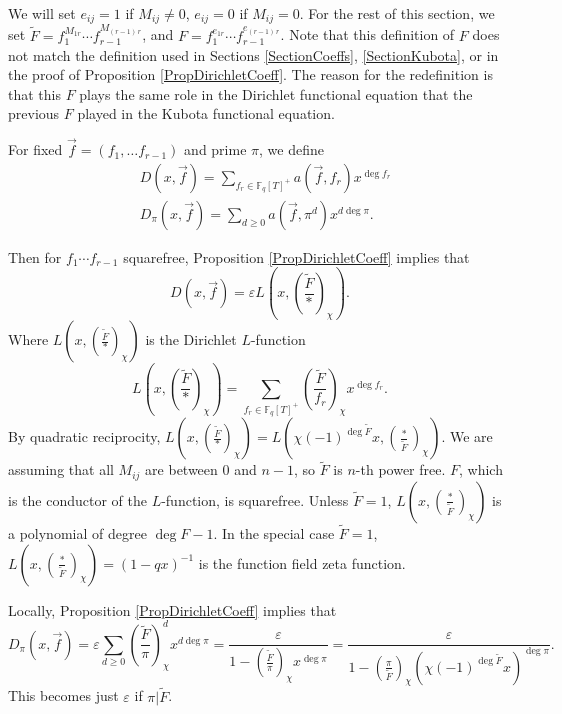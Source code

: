 \documentclass[11pt,letterpaper]{article}
\theoremstyle{definition}
\theoremstyle{remark}
\numberwithin{equation}{section}
\theoremstyle{dotless}
\newcommand{\F}{\mathbb{F}}
\newcommand{\res}[2]{\left(\frac{#1}{#2}\right)}
\renewcommand{\tilde}{\widetilde}
\begin{document}
We will set $e_{ij}=1$ if $M_{ij}\neq 0$, $e_{ij}=0$ if $M_{ij}=0$. For the rest of this section, we set $\tilde{F}=f_1^{M_{1r}}\cdots f_{r-1}^{M_{(r-1) \, r}}$, and $F = f_1^{e_{1r}}\cdots f_{r-1}^{e_{(r-1) \, r}}$. Note that this definition of $F$ does not match the definition used in Sections \ref{SectionCoeffs}, \ref{SectionKubota}, or in the proof of Proposition \ref{PropDirichletCoeff}. The reason for the redefinition is that this $F$ plays the same role in the Dirichlet functional equation that the previous $F$ played in the Kubota functional equation. 

For fixed $\vec{f}=(f_1, \ldots f_{r-1})$ and prime $\pi$, we define 
\begin{align}
&D(x, \vec{f}) = \sum_{f_r \in \F_q[T]^+} a(\vec{f}, f_r) x^{\deg f_r} \\
&D_{\pi}(x, \vec{f}) = \sum_{d \geq 0} a(\vec{f}, \pi^d)x^{d \deg \pi} .
\end{align}

Then for $f_1\cdots f_{r-1}$ squarefree, Proposition \ref{PropDirichletCoeff} implies that 
\begin{equation} \label{DirichletGlobalEval}
D(x, \vec{f}) = \varepsilon L\left(x, \res{\tilde{F}}{*}_{\chi}\right) .
\end{equation} 
Where $L\left(x, \res{\tilde{F}}{*}_{\chi}\right)$ is the Dirichlet $L$-function 
\begin{equation*}
L\left(x, \res{\tilde{F}}{*}_{\chi}\right)=\sum_{f_r \in \F_q[T]^+} \res{\tilde{F}}{f_r}_{\chi} x^{\deg f_r} .
\end{equation*}
By quadratic reciprocity, $L\left(x, \res{\tilde{F}}{*}_{\chi}\right)= L\left(\chi(-1)^{\deg \tilde{F}} x, \res{*}{\tilde{F}}_{\chi}\right)$.
We are assuming that all $M_{ij}$ are between $0$ and $n-1$, so $\tilde{F}$ is $n$-th power free. $F$, which is the conductor of the $L$-function, is squarefree. Unless $\tilde{F}=1$, $L\left(x, \res{*}{\tilde{F}}_{\chi}\right)$ is a polynomial of degree $\deg F-1$. In the special case $\tilde{F}=1$, $L\left(x, \res{*}{\tilde{F}}_{\chi}\right) = (1-qx)^{-1}$ is the function field zeta function.

Locally, Proposition \ref{PropDirichletCoeff} implies that 
\begin{equation} \label{DirichletLocalEval}
D_{\pi}(x, \vec{f}) = \varepsilon \sum_{d \geq 0} \res{\tilde{F}}{\pi}_{\chi}^d x^{d \deg \pi} = \frac{\varepsilon}{1-\res{\tilde{F}}{\pi}_{\chi} x^{\deg \pi}} = \frac{\varepsilon}{1-\res{\pi}{\tilde{F}}_{\chi} (\chi(-1)^{\deg \tilde{F}} x)^{\deg \pi}}.
\end{equation} 
This becomes just $\varepsilon$ if $\pi | \tilde{F}$. 
\end{document}
